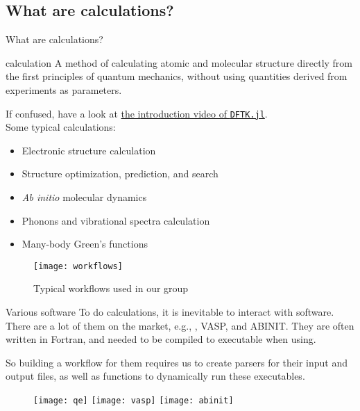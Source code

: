 \subsection{What are \ab{} calculations?}

\begin{frame}[allowframebreaks]{What are \ab{} calculations?}
    \begin{definitionblock}{\ab{} calculation}
        A method of calculating atomic and molecular structure directly from the first
        principles of quantum mechanics, without using quantities derived from experiments
        as parameters.
    \end{definitionblock}

    If confused, have a look at \href{https://youtu.be/-RomkxjlIcQ}{the introduction video of \texttt{DFTK.jl}}.\\

    Some typical \ab{} calculations:
    \begin{itemize}
        \item Electronic structure calculation
        \item Structure optimization, prediction, and search
        \item \textit{Ab initio} molecular dynamics
        \item Phonons and vibrational spectra calculation
        \item Many-body Green's functions
    \end{itemize}

    \framebreak

    \begin{figure}[H]
        \centering
        \texttt{[image: workflows]}
        \caption{Typical \ab{} workflows used in our group}
        \label{eq:workflows}
    \end{figure}
\end{frame}

\begin{frame}{Various \ab{} software}
    To do \ab{} calculations, it is inevitable to interact with \ab{} software.
    There are a lot of them on the market, e.g., \qe{}, VASP, and ABINIT.
    They are often written in Fortran, and needed to be compiled to executable
    when using.

    So building a workflow for them requires us to create parsers for their input and output
    files, as well as functions to dynamically run these executables.

    \begin{figure}[b]
        \centering
        \texttt{[image: qe]}
        \hfill
        \texttt{[image: vasp]}
        \hfill
        \texttt{[image: abinit]}
        \label{fig:abinitsoftware}
    \end{figure}
\end{frame}
